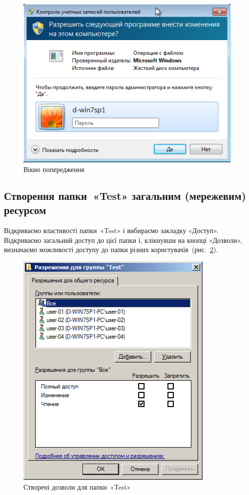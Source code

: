 \documentclass[
	a4paper,
	oneside,
	DIV = 12,
	fontsize = 13pt,
	headings = normal,
]{scrartcl}
\begin{document}
			\begin{figure}[!htbp]
				\centering
				\includegraphics[height = 10\baselineskip]{../01-solution/y03s01-pcdiag-lab-08-p13-01.png}
				\caption{Вікно попередження}
				\label{fig:user-access-prompt}
			\end{figure}

		\subsection{Створення папки~«\textenglish{Test}» загальним (мережевим) ресурсом}
			Відкриваємо властивості папки~«\textenglish{Test}» і вибираємо закладку «Доступ». Відкриваємо загальний доступ до цієї папки і, клікнувши на кнопці «Дозволи», визначаємо можливості доступу до папки різних користувачів~(рис.~\ref{fig:test-dir-permissions}).

			\begin{figure}[!htbp]
				\centering
				\includegraphics[height = 13\baselineskip]{../01-solution/y03s01-pcdiag-lab-08-p14.png}
				\caption{Створені дозволи для папки~«\textenglish{Test}»}
				\label{fig:test-dir-permissions}
			\end{figure}
\end{document}
